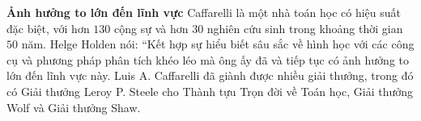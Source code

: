 \begin{multicols}{2}
	\vskip 0.1cm
	\textbf{\color{doisongtoanhoc}Ảnh hưởng to lớn đến lĩnh vực}
	\vskip 0.1cm
	Caffarelli là một nhà toán học có hiệu suất đặc biệt, với hơn $130$ cộng sự và hơn $30$ nghiên cứu sinh trong khoảng thời gian $50$ năm.
	\vskip 0.1cm
	Helge Holden nói: ``Kết hợp sự hiểu biết sâu sắc về hình học với các công cụ và phương pháp phân tích khéo léo mà ông ấy đã và tiếp tục có ảnh hưởng to lớn đến lĩnh vực này.
	\vskip 0.1cm
	Luis A. Caffarelli đã giành được nhiều giải thưởng, trong đó có Giải thưởng Leroy P. Steele cho Thành tựu Trọn đời về Toán học, Giải thưởng Wolf và Giải thưởng Shaw.
\end{multicols}

